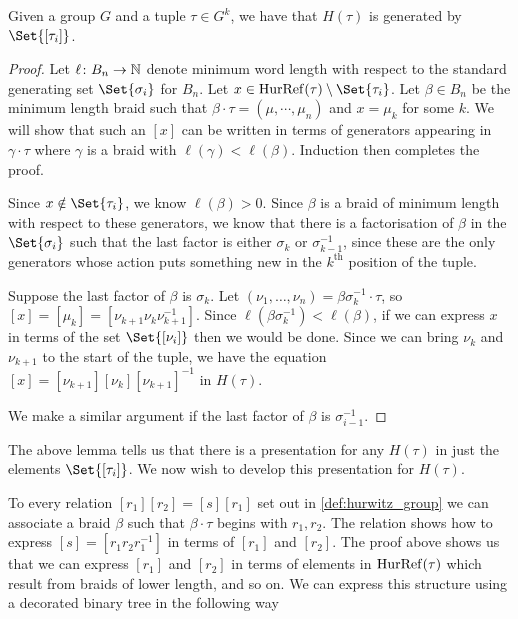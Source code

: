\begin{lemma}
	\label{lem:hurwitz_group_generators}
	Given a group $G$ and a tuple $\tau \in G^k$, we have that $H(\tau)$ is generated by $\Set{[\tau_i]}$.
\end{lemma}
\begin{proof}
	Let $\ell \colon B_n \to \mathbb{N}$ denote minimum word length with respect to the standard generating set $\Set{\sigma_i} $ for $B_n$.
	Let $x \in \hurref(\tau) \setminus \Set{\tau_i}$.
	Let $\beta \in B_n$ be the minimum length braid such that $\beta \cdot \tau =(\mu,\cdots,\mu_n)$ and $x=\mu_k$ for some $k$.
	We will show that such an $[x]$ can be written in terms of generators appearing in $\gamma \cdot \tau$ where  $\gamma$ is a braid with $\ell(\gamma)<\ell(\beta)$.
	Induction then completes the proof.

	Since $x \notin \Set{\tau_i}$, we know $\ell(\beta)>0$.
	Since $\beta$ is a braid of minimum length with respect to these generators, we know that there is a factorisation of $\beta$ in the $\Set{\sigma_i} $ such that the last factor is either $\sigma_k$ or  $\sigma_{k-1}^{-1}$, since these are the only generators whose action puts something new in the $k^{\text{th}}$ position of the tuple.

	Suppose the last factor of $\beta$ is $\sigma_k$.
	Let $(\nu_1,\ldots,\nu_n) = \beta\sigma_k^{-1} \cdot \tau$, so $[x] = [\mu_k] = [\nu_{k+1}\nu_k\nu_{k+1}^{-1}]$.
	Since $\ell(\beta \sigma_k^{-1}) < \ell(\beta)$, if we can express $x$ in terms of the set $\Set{[\nu_i]}$ then we would be done.
	Since we can bring $\nu_k$ and  $\nu_{k+1}$ to the start of the tuple, we have the equation $[x]=[\nu_{k+1}][\nu_k][\nu_{k+1}]^{-1}$ in $H(\tau)$.

	We make a similar argument if the last factor of $\beta$ is  $\sigma_{i-1}^{-1}$.
\end{proof}

The above lemma tells us that there is a presentation for any $H(\tau)$ in just the elements $\Set{[\tau_i]} $.
We now wish to develop this presentation for $H(\tau)$.

To every relation $[r_1][r_2]=[s][r_1]$ set out in \cref{def:hurwitz_group} we can associate a braid $\beta$ such that  $\beta \cdot \tau$ begins with $r_1,r_2$.
The relation shows how to express $[s]=[r_1r_2r_1^{-1}]$ in terms of $[r_1]$ and $[r_2]$.
The proof above shows us that we can express $[r_1]$ and $[r_2]$ in terms of elements in  $\operatorname{HurRef}(\tau)$ which result from braids of lower length, and so on.
We can express this structure using a decorated binary tree in the following way

